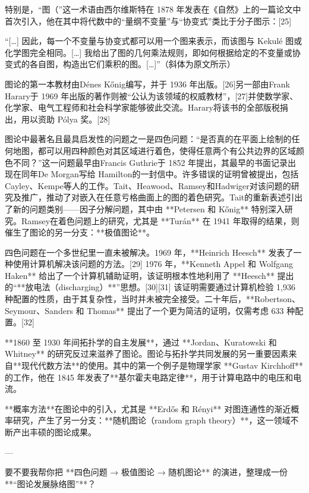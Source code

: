 特别是，“图（”这一术语由西尔维斯特在 1878 年发表在《自然》上的一篇论文中首次引入，他在其中将代数中的“量纲不变量”与“协变式”类比于分子图示：[25]

“[…] 因此，每一个不变量与协变式都可以用一个图来表示，而该图与 Kekulé 图或化学图完全相同。[…] 我给出了图的几何乘法规则，即如何根据给定的不变量或协变式的各自图，构造出它们乘积的图。[…]”（斜体为原文所示）

图论的第一本教材由Dénes Kőnig编写，并于 1936 年出版。[26]另一部由Frank Harary于 1969 年出版的著作则被“公认为该领域的权威教材”，[27]并使数学家、化学家、电气工程师和社会科学家能够彼此交流。Harary将该书的全部版税捐出，用以资助 Pólya 奖。[28]

图论中最著名且最具启发性的问题之一是四色问题：“是否真的在平面上绘制的任何地图，都可以用四种颜色对其区域进行着色，使得任意两个有公共边界的区域颜色不同？”这一问题最早由Francis Guthrie于 1852 年提出，其最早的书面记录出现在同年De Morgan写给 Hamilton的一封信中。许多错误的证明曾被提出，包括Cayley、Kempe等人的工作。Tait、Heawood、Ramsey和Hadwiger对该问题的研究及推广，推动了对嵌入在任意亏格曲面上的图的着色研究。Tait的重新表述引出了新的问题类别——因子分解问题，其中由 **Petersen 和 Kőnig** 特别深入研究。Ramsey在着色问题上的研究，尤其是 **Turán** 在 1941 年取得的结果，则催生了图论的另一分支：**极值图论**。

四色问题在一个多世纪里一直未被解决。1969 年，**Heinrich Heesch** 发表了一种使用计算机解决该问题的方法。[29] 1976 年，**Kenneth Appel 和 Wolfgang Haken** 给出了一个计算机辅助证明，该证明根本性地利用了 **Heesch** 提出的“**放电法（discharging）**”思想。[30][31] 该证明需要通过计算机检验 1,936 种配置的性质，由于其复杂性，当时并未被完全接受。二十年后，**Robertson、Seymour、Sanders 和 Thomas** 提出了一个更为简洁的证明，仅需考虑 633 种配置。[32]

**1860 至 1930 年间拓扑学的自主发展**，通过 **Jordan、Kuratowski 和 Whitney** 的研究反过来滋养了图论。图论与拓扑学共同发展的另一重要因素来自**现代代数方法**的使用。其中的第一个例子是物理学家 **Gustav Kirchhoff** 的工作，他在 1845 年发表了**基尔霍夫电路定律**，用于计算电路中的电压和电流。

**概率方法**在图论中的引入，尤其是 **Erdős 和 Rényi** 对图连通性的渐近概率研究，产生了另一分支：**随机图论（random graph theory）**，这一领域不断产出丰硕的图论成果。

---

要不要我帮你把 **四色问题 → 极值图论 → 随机图论** 的演进，整理成一份 **“图论发展脉络图”**？
